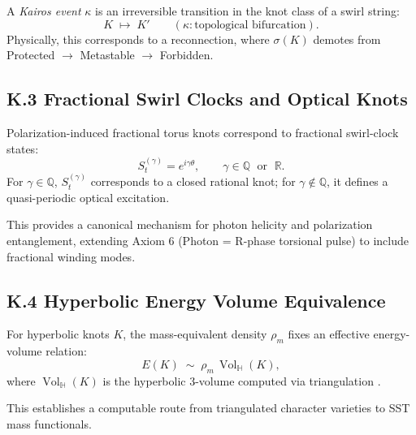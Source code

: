 \documentclass[10pt,reprint,aps,onecolumn,nofootinbib]{revtex4-2}
\newcommand{\Vol}{\operatorname{Vol}}   %
\begin{document}
    \begin{definition}
        A \emph{Kairos event} $\kappa$ is an irreversible transition in the knot class of a swirl string:
        \[
            K \;\mapsto\; K' \qquad (\kappa: \text{topological bifurcation}).
        \]
        Physically, this corresponds to a reconnection, where $\sigma(K)$ demotes from Protected $\to$ Metastable $\to$ Forbidden.
    \end{definition}

    \subsection*{K.3 Fractional Swirl Clocks and Optical Knots}

    \begin{theorem}
        Polarization-induced fractional torus knots correspond to fractional swirl-clock states:
        \[
            S_t^{(\gamma)} = e^{i \gamma \theta}, \qquad \gamma \in \mathbb{Q}\;\text{ or }\;\mathbb{R}.
        \]
        \]
        For $\gamma \in \mathbb{Q}$, $S_t^{(\gamma)}$ corresponds to a closed rational knot; for $\gamma \notin \mathbb{Q}$, it defines a quasi-periodic optical excitation.
    \end{theorem}

    This provides a canonical mechanism for photon helicity and polarization entanglement, extending Axiom 6 (Photon = R-phase torsional pulse) to include fractional winding modes.

    \subsection*{K.4 Hyperbolic Energy Volume Equivalence}

    \begin{axiom}
        For hyperbolic knots $K$, the mass-equivalent density $\rho_{\!m}$ fixes an effective energy-volume relation:
        \[
            E(K) \;\sim\; \rho_{\!m}\,\Vol_{\!\mathbb{H}}(K),
        \]
        where $\Vol_{\!\mathbb{H}}(K)$ is the hyperbolic 3-volume computed via triangulation \cite{Purcell2025,Petersen2024}.
    \end{axiom}

    This establishes a computable route from triangulated character varieties to SST mass functionals.
\end{document}
